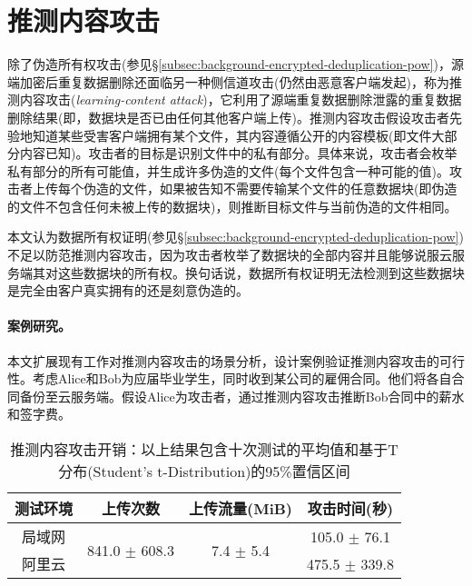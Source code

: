 \section{推测内容攻击}
\label{sec:featurespy-attack}

除了伪造所有权攻击(参见\S\ref{subsec:background-encrypted-deduplication-pow})，源端加密后重复数据删除还面临另一种侧信道攻击(仍然由恶意客户端发起)，称为推测内容攻击({\em learning-content attack})\cite{harnik2010side, zuo2018mitigating}，它利用了源端重复数据删除泄露的重复数据删除结果(即，数据块是否已由任何其他客户端上传)。推测内容攻击假设攻击者先验地知道某些受害客户端拥有某个文件，其内容遵循公开的内容模板(即文件大部分内容已知)。攻击者的目标是识别文件中的私有部分。具体来说，攻击者会枚举私有部分的所有可能值，并生成许多伪造的文件(每个文件包含一种可能的值)。攻击者上传每个伪造的文件，如果被告知不需要传输某个文件的任意数据块(即伪造的文件不包含任何未被上传的数据块)，则推断目标文件与当前伪造的文件相同。

本文认为数据所有权证明\cite{halevi11}(参见\S\ref{subsec:background-encrypted-deduplication-pow})不足以防范推测内容攻击，因为攻击者枚举了数据块的全部内容并且能够说服云服务端其对这些数据块的所有权。换句话说，数据所有权证明无法检测到这些数据块是完全由客户真实拥有的还是刻意伪造的。

\paragraph*{案例研究。}
本文扩展现有工作\cite{harnik2010side,zuo2018mitigating}对推测内容攻击的场景分析，设计案例验证推测内容攻击的可行性。考虑Alice和Bob为应届毕业学生，同时收到某公司的雇佣合同。他们将各自合同备份至云服务端。假设Alice为攻击者，通过推测内容攻击推断Bob合同中的薪水和签字费。

\begin{table}[!htb]
    \small
    \centering
    \begin{tabular}{@{}cccc@{}}
    \toprule
    测试环境 & 上传次数                            & 上传流量(MiB)                       & 攻击时间(秒)        \\ \midrule
    局域网  & \multirow{2}{*}{841.0 $\pm$ 608.3} & \multirow{2}{*}{7.4 $\pm$ 5.4} & 105.0 $\pm$ 76.1 \\
    阿里云  &                                 &                                 & 475.5 $\pm$ 339.8 \\
    \bottomrule
    \end{tabular}
    \caption{推测内容攻击开销：以上结果包含十次测试的平均值和基于T分布(Student's t-Distribution)的95\%置信区间}
    \label{tab:LRI-verify}
\end{table}

